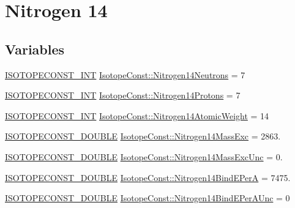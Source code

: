 \hypertarget{group___isotope_const-_nitrogen-_n14}{}\section{Nitrogen 14}
\label{group___isotope_const-_nitrogen-_n14}
\subsection*{Variables}
\begin{DoxyCompactItemize}
\item 
\mbox{\hyperlink{group___isotope_const-_macros_ga5f18360b3e99483a35c32d789e62621c}{I\+S\+O\+T\+O\+P\+E\+C\+O\+N\+S\+T\+\_\+\+I\+NT}} \mbox{\hyperlink{group___isotope_const-_nitrogen-_n14_ga5a3aaa84cc8f989646564d92a00eaa8f}{Isotope\+Const\+::\+Nitrogen14\+Neutrons}} = 7
\item 
\mbox{\hyperlink{group___isotope_const-_macros_ga5f18360b3e99483a35c32d789e62621c}{I\+S\+O\+T\+O\+P\+E\+C\+O\+N\+S\+T\+\_\+\+I\+NT}} \mbox{\hyperlink{group___isotope_const-_nitrogen-_n14_gac3099927646006e549a82912c48e999e}{Isotope\+Const\+::\+Nitrogen14\+Protons}} = 7
\item 
\mbox{\hyperlink{group___isotope_const-_macros_ga5f18360b3e99483a35c32d789e62621c}{I\+S\+O\+T\+O\+P\+E\+C\+O\+N\+S\+T\+\_\+\+I\+NT}} \mbox{\hyperlink{group___isotope_const-_nitrogen-_n14_ga347d4bd26a283e446cd4c7cff111f90e}{Isotope\+Const\+::\+Nitrogen14\+Atomic\+Weight}} = 14
\item 
\mbox{\hyperlink{group___isotope_const-_macros_ga8f45a7272ce02c0b4c65c44636ed719a}{I\+S\+O\+T\+O\+P\+E\+C\+O\+N\+S\+T\+\_\+\+D\+O\+U\+B\+LE}} \mbox{\hyperlink{group___isotope_const-_nitrogen-_n14_ga4fe9f5a71562674f13177365b8e8871a}{Isotope\+Const\+::\+Nitrogen14\+Mass\+Exc}} = 2863.
\item 
\mbox{\hyperlink{group___isotope_const-_macros_ga8f45a7272ce02c0b4c65c44636ed719a}{I\+S\+O\+T\+O\+P\+E\+C\+O\+N\+S\+T\+\_\+\+D\+O\+U\+B\+LE}} \mbox{\hyperlink{group___isotope_const-_nitrogen-_n14_ga4ed31920859797539e14a5cc51fa0cfb}{Isotope\+Const\+::\+Nitrogen14\+Mass\+Exc\+Unc}} = 0.
\item 
\mbox{\hyperlink{group___isotope_const-_macros_ga8f45a7272ce02c0b4c65c44636ed719a}{I\+S\+O\+T\+O\+P\+E\+C\+O\+N\+S\+T\+\_\+\+D\+O\+U\+B\+LE}} \mbox{\hyperlink{group___isotope_const-_nitrogen-_n14_gaf6bd29ae6f65023d1816304ff01c2e9e}{Isotope\+Const\+::\+Nitrogen14\+Bind\+E\+PerA}} = 7475.
\item 
\mbox{\hyperlink{group___isotope_const-_macros_ga8f45a7272ce02c0b4c65c44636ed719a}{I\+S\+O\+T\+O\+P\+E\+C\+O\+N\+S\+T\+\_\+\+D\+O\+U\+B\+LE}} \mbox{\hyperlink{group___isotope_const-_nitrogen-_n14_ga3a4d49a5af4e6c42e0ebc0a8f8d761a2}{Isotope\+Const\+::\+Nitrogen14\+Bind\+E\+Per\+A\+Unc}} = 0

\end{DoxyCompactItemize}
